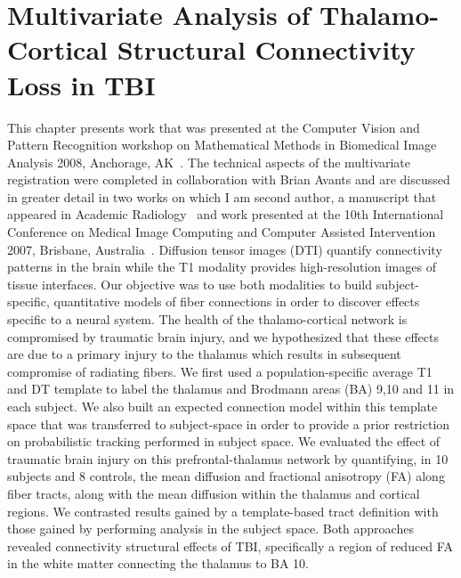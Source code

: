 
\chapter{Multivariate Analysis of Thalamo-Cortical Structural Connectivity Loss in TBI}
\label{chap_tbi}

This chapter presents work that was presented at the Computer Vision and Pattern Recognition workshop on Mathematical Methods in Biomedical Image Analysis 2008, Anchorage, AK~\cite{duda08mmbia}. The technical aspects of the multivariate registration were completed in collaboration with Brian Avants and are discussed in greater detail in two works on which I am second author, a  manuscript that appeared in Academic Radiology~\cite{Avants2008} and work presented at the 10th International Conference on Medical Image Computing and Computer Assisted Intervention 2007, Brisbane, Australia~\cite{Avants2007}. Diffusion tensor images (DTI) quantify connectivity patterns in the brain while the T1 modality provides high-resolution images of tissue interfaces.  Our objective was to use both modalities to build subject-specific, quantitative models of fiber connections in order to discover effects specific to a neural system. The health of the thalamo-cortical network is compromised by traumatic brain injury, and we hypothesized that these effects are due to a primary injury to the thalamus which results in subsequent compromise of radiating fibers. We first used a population-specific average T1 and DT template to label the thalamus and Brodmann areas (BA) 9,10 and 11 in each subject.  We also built an expected connection model within this template space that was transferred to subject-space in order to provide a prior restriction on probabilistic tracking performed in subject space.  We evaluated the effect of traumatic brain injury on this prefrontal-thalamus network by quantifying, in 10 subjects and 8 controls, the mean diffusion and fractional anisotropy (FA) along fiber tracts, along with the mean diffusion within the thalamus and cortical regions.  We contrasted results gained by a template-based tract definition with those gained by performing analysis in the subject space. Both approaches revealed connectivity structural effects of TBI, specifically a region of reduced FA in the white matter connecting the thalamus to BA 10. 

